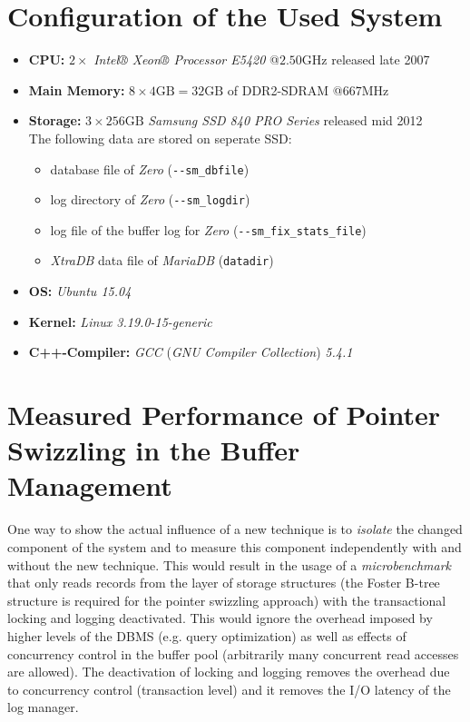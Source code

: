 \section[System Configuration]{Configuration of the Used System}

\begin{@empty}
    \begin{itemize}
        \itemsep0em
        \item	\textbf{CPU:} $2 \times $ \emph{Intel® Xeon® Processor E5420} @$2.50\text{GHz}$ released late 2007
        \item	\textbf{Main Memory:} $8 \times 4\text{GB} = 32\text{GB}$ of DDR2-SDRAM @$667\text{MHz}$
        \item	\textbf{Storage:} $3 \times 256\text{GB}$ \emph{Samsung SSD 840 PRO Series} released mid 2012 \\
            The following data are stored on seperate SSD:
            \begin{itemize}
                \item	database file of \emph{Zero} (\lstinline{--sm_dbfile})
                \item	log directory of \emph{Zero} (\lstinline{--sm_logdir})
                \item	log file of the buffer log for \emph{Zero} (\lstinline{--sm_fix_stats_file})
                \item	\emph{XtraDB} data file of \emph{MariaDB} (\lstinline{datadir})
            \end{itemize}
        \item	\textbf{OS:} \emph{Ubuntu 15.04}
        \item	\textbf{Kernel:} \emph{Linux 3.19.0-15-generic}
        \item	\textbf{C++-Compiler:} \emph{GCC} (\emph{GNU Compiler Collection}) \emph{5.4.1}
    \end{itemize}
\end{@empty}

\section[Measured Performance]{Measured Performance of Pointer Swizzling in the Buffer Management}

    One way to show the actual influence of a new technique is to \emph{isolate} the changed component of the system and to measure this component independently with and without the new technique. This would result in the usage of a \emph{microbenchmark} that only reads records from the layer of storage structures (the Foster B-tree structure is required for the pointer swizzling approach) with the transactional locking and logging deactivated. This would ignore the overhead imposed by higher levels of the DBMS (e.g. query optimization) as well as effects of concurrency control in the buffer pool (arbitrarily many concurrent read accesses are allowed). The deactivation of locking and logging removes the overhead due to concurrency control (transaction level) and it removes the I/O latency of the log manager.

